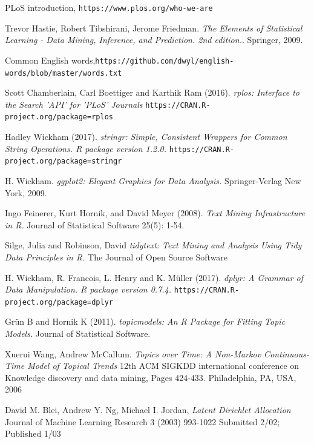 \documentclass[11pt]{article}
\begin{document}
\begin{thebibliography}{12}
PLoS introduction,
\texttt{https://www.plos.org/who-we-are}

Trevor Hastie, Robert Tibshirani, Jerome Friedman.
\textit{The Elements of Statistical Learning - Data Mining, Inference, and Prediction. 2nd edition.}. 
Springer, 2009.

Common English words,\texttt{https://github.com/dwyl/english-words/blob/master/words.txt}

Scott Chamberlain, Carl Boettiger and Karthik Ram (2016). 
\textit{rplos: Interface to the Search 'API' for 'PLoS' Journals} \texttt{https://CRAN.R-project.org/package=rplos}

Hadley Wickham (2017). 
\textit{stringr: Simple, Consistent Wrappers for Common String Operations. R package version 1.2.0.} \texttt{https://CRAN.R-project.org/package=stringr}

H. Wickham. 
\textit{ggplot2: Elegant Graphics for Data Analysis.}
Springer-Verlag New York, 2009.

Ingo Feinerer, Kurt Hornik, and David Meyer (2008).
\textit{Text Mining Infrastructure in R.}
Journal of Statistical Software 25(5): 1-54.

Silge, Julia and Robinson, David
\textit{tidytext: Text Mining and Analysis Using Tidy Data Principles in R.}
The Journal of Open Source Software

H. Wickham, R. Francois, L. Henry and K. Müller (2017). 
\textit{dplyr: A Grammar of Data Manipulation. R package version 0.7.4.} \texttt{https://CRAN.R-project.org/package=dplyr}

Grün B and Hornik K (2011). 
\textit{topicmodels: An R Package for Fitting Topic Models.}
Journal of Statistical Software. 

Xuerui Wang, Andrew McCallum.
\textit{Topics over Time: A Non-Markov Continuous-Time Model of Topical Trends}
12th ACM SIGKDD international conference on Knowledge discovery and data mining, Pages 424-433. Philadelphia, PA, USA, 2006 

David M. Blei, Andrew Y. Ng, Michael I. Jordan,
\textit{Latent Dirichlet Allocation}
Journal of Machine Learning Research 3 (2003) 993-1022
Submitted 2/02; Published 1/03

\end{thebibliography}
\end{document}
